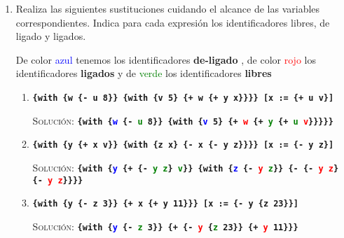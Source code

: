 \documentclass[letterpaper,11pt]{article}
\begin{document}
\begin{enumerate}
\begin{proof}
        \newpage
        Así, 
        \begin{center}
            \texttt{(length (ligada e)) $= 5 \not \leq 1$ (length (de-ligado e))}
        \end{center}

        Por lo tanto, la desigualdad \texttt{(length (ligada e)) $\leq$ 
        (length (de-ligado e))} es falsa.

    \end{proof}

    \item Realiza las siguientes sustituciones cuidando el alcance de las 
    variables correspondientes. Indica para cada expresión los identificadores 
    libres, de ligado y ligados. 
    
    De color \textcolor{blue}{azul} tenemos los identificadores \textbf{de-ligado} , de 
    color \textcolor{red}{rojo} los identificadores \textbf{ligados} y de \textcolor{green}{verde}
    los identificadores \textbf{libres}
    \begin{enumerate}
        \item \texttt{\textbf{\{with \{w \{- u 8\}\} \{with \{v 5\} 
        \{+ w \{+ y x\}\}\}\} {[}x := \{+ u v\}{]}}}

        \textsc{Solución:}
        \texttt{\textbf{\{with \{\textcolor{blue}{w} \{- \textcolor{green}{u} 8\}\} \{with 
        \{\textcolor{blue}{v} 5\} \{+ \textcolor{red}{w} \{+ \textcolor{green}{y} 
        \{+ \textcolor{green}{u} \textcolor{red}{v}\}\}\}\}\}}}

        \item \texttt{\textbf{\{with \{y \{+ x v\}\} \{with \{z x\} 
        \{- x \{- y z\}\}\}\} [x := \{- y z\}]}}

        \textsc{Solución:}
        \texttt{\textbf{\{with \{\textcolor{blue}{y} \{+ \{- \textcolor{green}{y} \textcolor{green}{z}\} 					\textcolor{green}{v}\}\} \{with \{\textcolor{blue}{z} \{- \textcolor{red}{y} \textcolor{green}{z}\}\} 
        \{- \{- \textcolor{red}{y} \textcolor{red}{z}\} \{- \textcolor{red}{y} \textcolor{red}{z}\}\}\}\}}}
        
        \item \texttt{\textbf{\{with \{y \{- z 3\}\} \{+ x \{+ y 11\}\}\} 
        [x := \{- y \{z 23\}\}]}}

        \textsc{Solución:}
        \texttt{\textbf{\{with \{\textcolor{blue}{y} \{- \textcolor{green}{z} 3\}\} \{+ \{- \textcolor{red}{y} 
        \{\textcolor{green}{z} 23\}\} \{+ \textcolor{red}{y} 11\}\}\}}}
        

\end{enumerate}
\end{enumerate}
\end{document}
